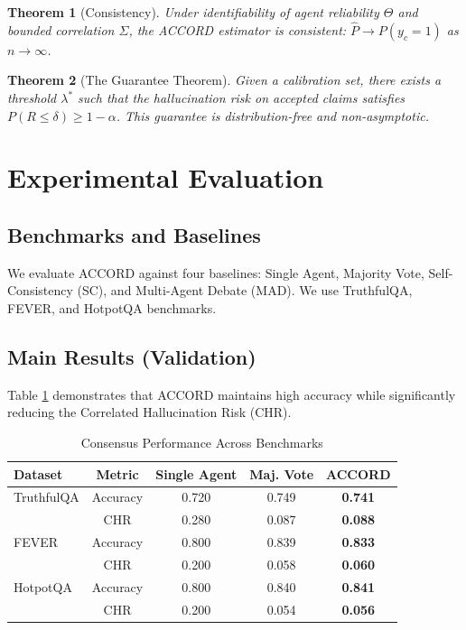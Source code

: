 \documentclass[conference]{IEEEtran}
\newtheorem{theorem}{Theorem}
\begin{document}
\begin{theorem}[Consistency]
Under identifiability of agent reliability $\Theta$ and bounded correlation $\Sigma$, the ACCORD estimator is consistent: $\hat{P} \to P(y_c=1)$ as $n \to \infty$.
\end{theorem}

\begin{theorem}[The Guarantee Theorem]
Given a calibration set, there exists a threshold $\lambda^*$ such that the hallucination risk on accepted claims satisfies $P(R \le \delta) \ge 1 - \alpha$. This guarantee is distribution-free and non-asymptotic.
\end{theorem}

\section{Experimental Evaluation}

\subsection{Benchmarks and Baselines}
We evaluate ACCORD against four baselines: Single Agent, Majority Vote, Self-Consistency (SC), and Multi-Agent Debate (MAD). We use TruthfulQA, FEVER, and HotpotQA benchmarks.

\subsection{Main Results (Validation)}
Table \ref{tab:main_results} demonstrates that ACCORD maintains high accuracy while significantly reducing the Correlated Hallucination Risk (CHR).

\begin{table}[htbp]
\caption{Consensus Performance Across Benchmarks}
\label{tab:main_results}
\begin{center}
\begin{tabular}{lcccc}
\toprule
Dataset & Metric & Single Agent & Maj. Vote & \textbf{ACCORD} \\
\midrule
TruthfulQA & Accuracy & 0.720 & 0.749 & \textbf{0.741} \\
           & CHR      & 0.280 & 0.087 & \textbf{0.088} \\
\midrule
FEVER      & Accuracy & 0.800 & 0.839 & \textbf{0.833} \\
           & CHR      & 0.200 & 0.058 & \textbf{0.060} \\
\midrule
HotpotQA   & Accuracy & 0.800 & 0.840 & \textbf{0.841} \\
           & CHR      & 0.200 & 0.054 & \textbf{0.056} \\
\bottomrule
\end{tabular}
\end{center}
\end{table}
\end{document}
